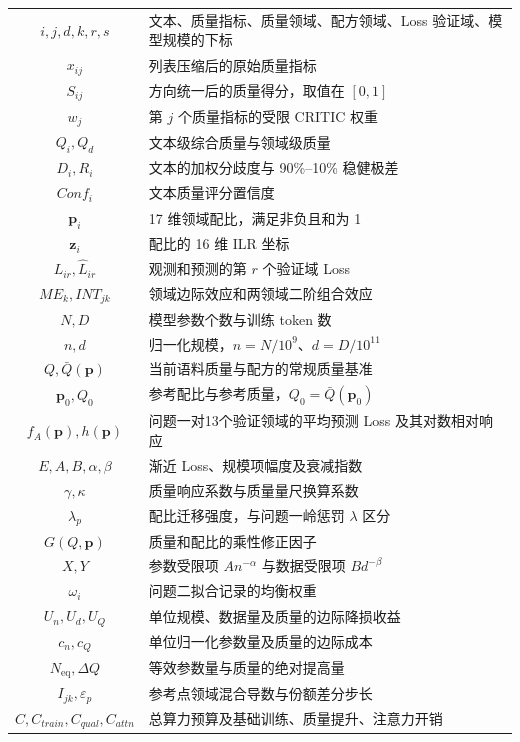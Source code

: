 \documentclass[bwprint]{gmcmthesis}
\numberwithin{equation}{section}
\numberwithin{figure}{section}
\numberwithin{table}{section}
\begin{document}
\begin{xltabular}{0.92\textwidth}{cX}
    $i,j,d,k,r,s$ & 文本、质量指标、质量领域、配方领域、Loss 验证域、模型规模的下标 \\
    $x_{ij}$ & 列表压缩后的原始质量指标 \\
    $S_{ij}$ & 方向统一后的质量得分，取值在 $[0,1]$ \\
    $w_j$ & 第 $j$ 个质量指标的受限 CRITIC 权重 \\
    $Q_i,Q_d$ & 文本级综合质量与领域级质量 \\
    $D_i,R_i$ & 文本的加权分歧度与 90\%--10\% 稳健极差 \\
    $Conf_i$ & 文本质量评分置信度 \\
    $\bm p_i$ & 17 维领域配比，满足非负且和为 1 \\
    $\bm z_i$ & 配比的 16 维 ILR 坐标 \\
    $L_{ir},\widehat L_{ir}$ & 观测和预测的第 $r$ 个验证域 Loss \\
    $ME_k,INT_{jk}$ & 领域边际效应和两领域二阶组合效应 \\
    $N,D$ & 模型参数个数与训练 token 数 \\
    $n,d$ & 归一化规模，$n=N/10^9$、$d=D/10^{11}$ \\
    $Q,\bar Q(\bm p)$ & 当前语料质量与配方的常规质量基准 \\
    $\bm p_0,Q_0$ & 参考配比与参考质量，$Q_0=\bar Q(\bm p_0)$ \\
    $f_A(\bm p),h(\bm p)$ & 问题一对13个验证领域的平均预测 Loss 及其对数相对响应 \\
    $E,A,B,\alpha,\beta$ & 渐近 Loss、规模项幅度及衰减指数 \\
    $\gamma,\kappa$ & 质量响应系数与质量量尺换算系数 \\
    $\lambda_p$ & 配比迁移强度，与问题一岭惩罚 $\lambda$ 区分 \\
    $G(Q,\bm p)$ & 质量和配比的乘性修正因子 \\
    $X,Y$ & 参数受限项 $An^{-\alpha}$ 与数据受限项 $Bd^{-\beta}$ \\
    $\omega_i$ & 问题二拟合记录的均衡权重 \\
    $U_n,U_d,U_Q$ & 单位规模、数据量及质量的边际降损收益 \\
    $c_n,c_Q$ & 单位归一化参数量及质量的边际成本 \\
    $N_{\mathrm{eq}},\Delta Q$ & 等效参数量与质量的绝对提高量 \\
    $I_{jk},\varepsilon_p$ & 参考点领域混合导数与份额差分步长 \\
    $C,C_{train},C_{qual},C_{attn}$ & 总算力预算及基础训练、质量提升、注意力开销 \\

\end{xltabular}
\end{document}

